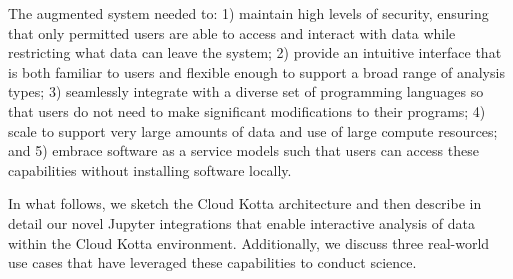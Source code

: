 The augmented system needed to: 
1) maintain high levels of security, ensuring that only permitted users
are able to access and interact with data while restricting what data can leave the system;
2) provide an intuitive interface that is both familiar to users and flexible
enough to support a broad range of analysis types;
3) seamlessly integrate with a diverse set of programming languages so that users do not
need to make significant modifications to their programs;
4) scale to support very large amounts of data and use of large compute
resources; and
5) embrace software as a service models such that users can access these
capabilities without installing software locally.  

In what follows, we sketch the Cloud Kotta architecture and then describe in detail our novel Jupyter integrations that enable interactive analysis of data within the Cloud Kotta environment. Additionally, we discuss three real-world use cases that have leveraged these capabilities to conduct science.
